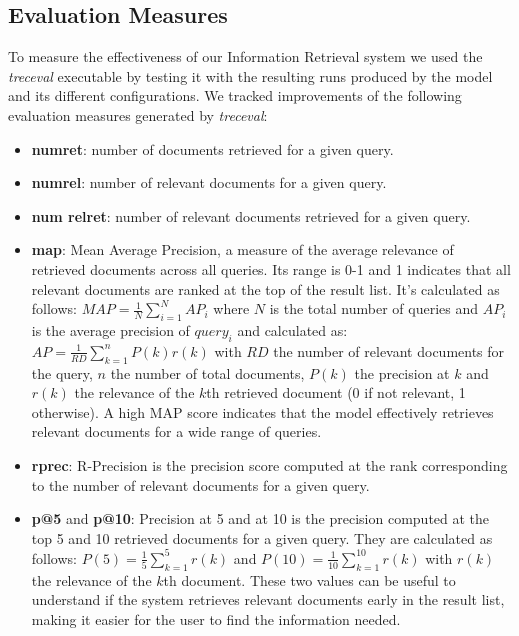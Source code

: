 \subsection{Evaluation Measures}
To measure the effectiveness of our Information Retrieval system we used the \textit{trec\textunderscore eval} executable by testing it with the resulting runs produced by the model and its different configurations.
\newline
We tracked improvements of the following evaluation measures generated by \textit{trec\textunderscore eval}:
\begin{itemize}
	\item \textbf{num\textunderscore ret}: number of documents retrieved for a given query.
	\item \textbf{num\textunderscore rel}: number of relevant documents for a given query.
	\item \textbf{num \textunderscore rel\textunderscore ret}: number of relevant documents retrieved for a given query.
    \item \textbf{map}: Mean Average Precision, a measure of the average relevance of retrieved documents across all queries. Its range is 0-1 and 1 indicates that all relevant documents are ranked at the top of the result list.
    \newline
    It's calculated as follows:
    $MAP = \frac{1}{N} \sum_{i=1}^{N}AP_i$
    where $N$ is the total number of queries and $AP_i$ is the average precision of $query_i$ and calculated as:
    $AP = \frac{1}{RD} \sum_{k=1}^{n}P(k)r(k)$
    with $RD$ the number of relevant documents for the query, $n$ the number of total documents, $P(k)$ the precision at $k$ and $r(k)$ the relevance of the $k$th retrieved document (0 if not relevant, 1 otherwise).
    \newline
    A high MAP score indicates that the model effectively retrieves relevant documents for a wide range of queries.
    \item \textbf{rprec}: R-Precision is the precision score computed at the rank corresponding to the number of relevant documents for a given query.
    \item \textbf{p@5} and \textbf{p@10}: Precision at 5 and at 10 is the precision computed at the top 5 and 10 retrieved documents for a given query.
    They are calculated as follows:
    $P(5) = \frac{1}{5} \sum_{k=1}^{5}r(k)$ and $P(10) = \frac{1}{10} \sum_{k=1}^{10}r(k)$ with $r(k)$ the relevance of the $k$th document.
    \newline
    These two values can be useful to understand if the system retrieves relevant documents early in the result list, making it easier for the user to find the information needed.

\end{itemize}





